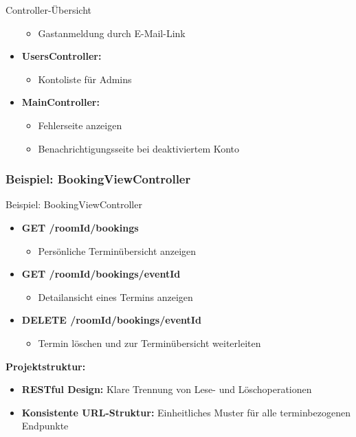 \documentclass{sdqbeamer}
\begin{document}
\begin{frame}{Controller-Übersicht}
\begin{itemize}
\begin{itemize}
            \item Gastanmeldung durch E-Mail-Link
        \end{itemize}
        \item \textbf{UsersController:}
        \begin{itemize}
            \item Kontoliste für Admins
        \end{itemize}
        \item \textbf{MainController:}
        \begin{itemize}
            \item Fehlerseite anzeigen
            \item Benachrichtigungsseite bei deaktiviertem Konto
        \end{itemize}
    \end{itemize}
\end{frame}

\subsubsection{Beispiel: BookingViewController}
\begin{frame}{Beispiel: BookingViewController}
    \begin{itemize}
        \item \textbf{GET /{roomId}/bookings}
        \begin{itemize}
            \item Persönliche Terminübersicht anzeigen
        \end{itemize}
        \item \textbf{GET /{roomId}/bookings/{eventId}}
        \begin{itemize}
            \item Detailansicht eines Termins anzeigen
        \end{itemize}
        \item \textbf{DELETE /{roomId}/bookings/{eventId}}
        \begin{itemize}
            \item Termin löschen und zur Terminübersicht weiterleiten
        \end{itemize}
    \end{itemize}
    \vspace{1em}
    \textbf{Projektstruktur:}
    \begin{itemize}
        \item \textbf{RESTful Design:} Klare Trennung von Lese- und Löschoperationen
        \item \textbf{Konsistente URL-Struktur:} Einheitliches Muster für alle terminbezogenen Endpunkte
    \end{itemize}
\end{frame}
\end{document}

